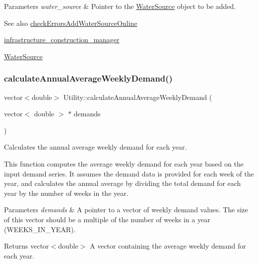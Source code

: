 \begin{DoxyParams}{Parameters}
{\em water\+\_\+source} & Pointer to the \mbox{\hyperlink{classWaterSource}{Water\+Source}} object to be added.\\
\hline
\end{DoxyParams}
\begin{DoxySeeAlso}{See also}
\mbox{\hyperlink{classUtility_a0674d7d95f4d6595f7e01817a4d84a98}{check\+Errors\+Add\+Water\+Source\+Online}} 

\mbox{\hyperlink{classUtility_a2eff94831dd7a4b7a4243ef69c5311d9}{infrastructure\+\_\+construction\+\_\+manager}} 

\mbox{\hyperlink{classWaterSource}{Water\+Source}} 
\end{DoxySeeAlso}
\mbox{\label{classUtility_a5bae4fe8c3f0c782f0cdf5d14b7b92a7}} 
\subsubsection{\texorpdfstring{calculate\+Annual\+Average\+Weekly\+Demand()}{calculateAnnualAverageWeeklyDemand()}}
{\footnotesize\ttfamily vector$<$double$>$ Utility\+::calculate\+Annual\+Average\+Weekly\+Demand (\begin{DoxyParamCaption}\item[{vector$<$ double $>$ $\ast$}]{demands }\end{DoxyParamCaption})}



Calculates the annual average weekly demand for each year. 

This function computes the average weekly demand for each year based on the input demand series. It assumes the demand data is provided for each week of the year, and calculates the annual average by dividing the total demand for each year by the number of weeks in the year.


\begin{DoxyParams}{Parameters}
{\em demands} & A pointer to a vector of weekly demand values. The size of this vector should be a multiple of the number of weeks in a year (W\+E\+E\+K\+S\+\_\+\+I\+N\+\_\+\+Y\+E\+AR).\\
\hline
\end{DoxyParams}
\begin{DoxyReturn}{Returns}
vector$<$double$>$ A vector containing the average weekly demand for each year. 
\end{DoxyReturn}
\mbox{\label{classUtility_a38381b003d13986e37757dfea683f7f9}} 
